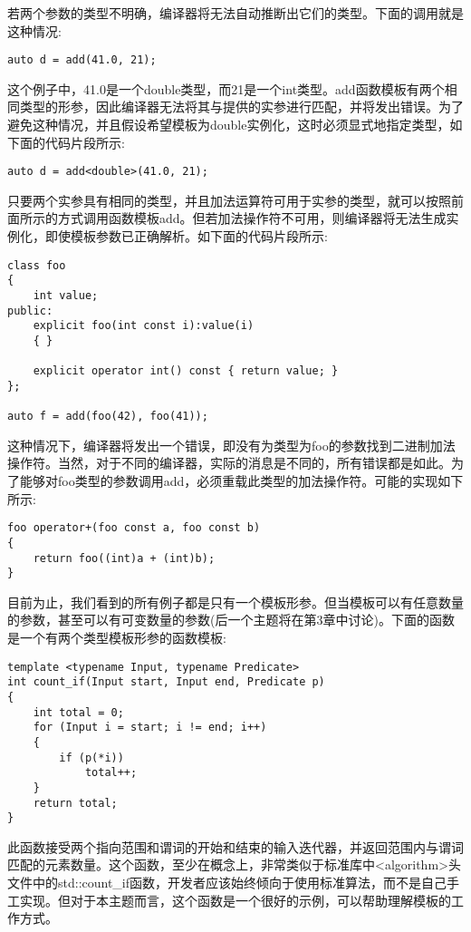 若两个参数的类型不明确，编译器将无法自动推断出它们的类型。下面的调用就是这种情况:

\begin{lstlisting}[style=styleCXX]
auto d = add(41.0, 21);
\end{lstlisting}

这个例子中，41.0是一个double类型，而21是一个int类型。add函数模板有两个相同类型的形参，因此编译器无法将其与提供的实参进行匹配，并将发出错误。为了避免这种情况，并且假设希望模板为double实例化，这时必须显式地指定类型，如下面的代码片段所示:

\begin{lstlisting}[style=styleCXX]
auto d = add<double>(41.0, 21);
\end{lstlisting}

只要两个实参具有相同的类型，并且加法运算符可用于实参的类型，就可以按照前面所示的方式调用函数模板add。但若加法操作符不可用，则编译器将无法生成实例化，即使模板参数已正确解析。如下面的代码片段所示:

\begin{lstlisting}[style=styleCXX]
class foo
{
	int value;
public:
	explicit foo(int const i):value(i)
	{ }
	
	explicit operator int() const { return value; }
};

auto f = add(foo(42), foo(41));
\end{lstlisting}

这种情况下，编译器将发出一个错误，即没有为类型为foo的参数找到二进制加法操作符。当然，对于不同的编译器，实际的消息是不同的，所有错误都是如此。为了能够对foo类型的参数调用add，必须重载此类型的加法操作符。可能的实现如下所示:

\begin{lstlisting}[style=styleCXX]
foo operator+(foo const a, foo const b)
{
	return foo((int)a + (int)b);
}
\end{lstlisting}

目前为止，我们看到的所有例子都是只有一个模板形参。但当模板可以有任意数量的参数，甚至可以有可变数量的参数(后一个主题将在第3章中讨论)。下面的函数是一个有两个类型模板形参的函数模板:

\begin{lstlisting}[style=styleCXX]
template <typename Input, typename Predicate>
int count_if(Input start, Input end, Predicate p)
{
	int total = 0;
	for (Input i = start; i != end; i++)
	{
		if (p(*i))
			total++;
	}
	return total;
}
\end{lstlisting}

此函数接受两个指向范围和谓词的开始和结束的输入迭代器，并返回范围内与谓词匹配的元素数量。这个函数，至少在概念上，非常类似于标准库中<algorithm>头文件中的std::count\_if函数，开发者应该始终倾向于使用标准算法，而不是自己手工实现。但对于本主题而言，这个函数是一个很好的示例，可以帮助理解模板的工作方式。

